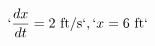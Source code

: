 \documentclass[preview]{standalone}
\begin{document}
\begin{align*}
`\frac{dx}{dt} = 2 \text{ ft/s}`, `x = 6 \text{ ft}`
\end{align*}
\end{document}
